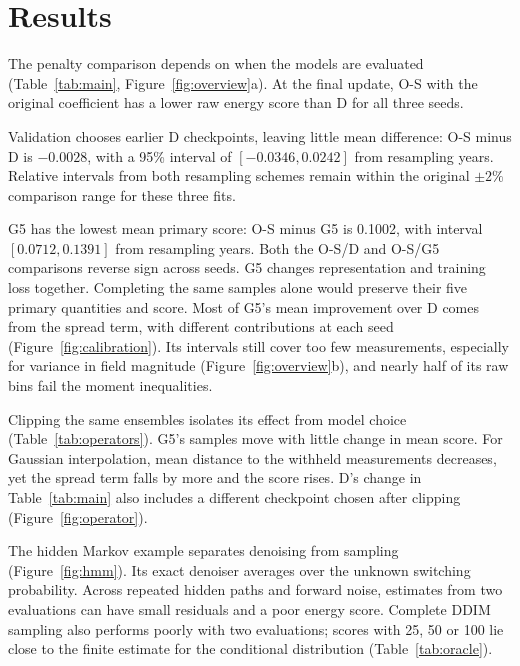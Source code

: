 \documentclass{article}
\begin{document}
\section{Results}

The penalty comparison depends on when the models are evaluated (Table~\ref{tab:main}, Figure~\ref{fig:overview}a). At the final update, O-S with the original coefficient has a lower raw energy score than D for all three seeds.

Validation chooses earlier D checkpoints, leaving little mean difference: O-S minus D is $-0.0028$, with a 95\% interval of $[-0.0346,0.0242]$ from resampling years. Relative intervals from both resampling schemes remain within the original $\pm2\%$ comparison range for these three fits.

G5 has the lowest mean primary score: O-S minus G5 is 0.1002, with interval $[0.0712,0.1391]$ from resampling years. Both the O-S/D and O-S/G5 comparisons reverse sign across seeds. G5 changes representation and training loss together. Completing the same samples alone would preserve their five primary quantities and score. Most of G5's mean improvement over D comes from the spread term, with different contributions at each seed (Figure~\ref{fig:calibration}). Its intervals still cover too few measurements, especially for variance in field magnitude (Figure~\ref{fig:overview}b), and nearly half of its raw bins fail the moment inequalities.



\begin{samepage}
Clipping the same ensembles isolates its effect from model choice (Table~\ref{tab:operators}). G5's samples move with little change in mean score. For Gaussian interpolation, mean distance to the withheld measurements decreases, yet the spread term falls by more and the score rises. D's change in Table~\ref{tab:main} also includes a different checkpoint chosen after clipping (Figure~\ref{fig:operator}).
\par
\end{samepage}

The hidden Markov example separates denoising from sampling (Figure~\ref{fig:hmm}). Its exact denoiser averages over the unknown switching probability. Across repeated hidden paths and forward noise, estimates from two evaluations can have small residuals and a poor energy score. Complete DDIM sampling also performs poorly with two evaluations; scores with 25, 50 or 100 lie close to the finite estimate for the conditional distribution (Table~\ref{tab:oracle}).
\end{document}
